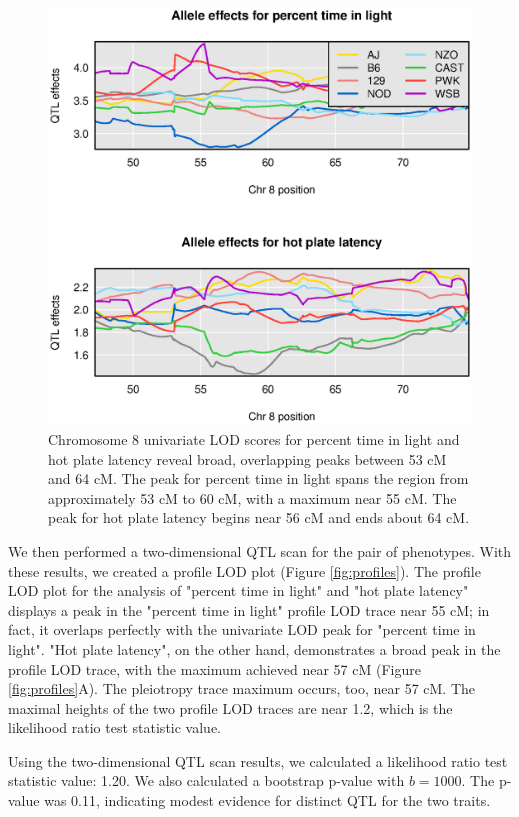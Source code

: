 \documentclass[12pt,twoside, lineno]{gsajnl}
\begin{document}
\begin{figure}
\includegraphics[width = \textwidth]{../Rmd/coefs.eps}
\caption{Chromosome 8 univariate LOD scores for percent time in light
  and hot plate latency reveal broad, overlapping peaks between 53 cM
  and 64 cM. The peak for percent time in light spans the region from
  approximately 53 cM to 60 cM, with a maximum near 55 cM. The peak
  for hot plate latency begins near 56 cM and ends about 64 cM.}
\label{fig:chr8-effects}
\end{figure}




We then performed a two-dimensional QTL scan for the pair of
phenotypes. With these results, we created a profile LOD plot (Figure
\ref{fig:profiles}). The profile LOD plot for the analysis of "percent
time in light" and "hot plate latency" displays a peak in the "percent
time in light" profile LOD trace near 55 cM; in fact, it overlaps
perfectly with the univariate LOD peak for "percent time in light".
"Hot plate latency", on the other hand, demonstrates a broad peak in
the profile LOD trace, with the maximum achieved near 57 cM (Figure
\ref{fig:profiles}A). The pleiotropy trace maximum occurs, too, near
57 cM. The maximal heights of the two profile LOD traces are near 1.2,
which is the likelihood ratio test statistic value.

Using the two-dimensional QTL scan results, we calculated a likelihood
ratio test statistic value: 1.20. We also calculated a bootstrap
p-value with $b = 1000$. The p-value was 0.11, indicating modest
evidence for distinct QTL for the two traits.
\end{document}
